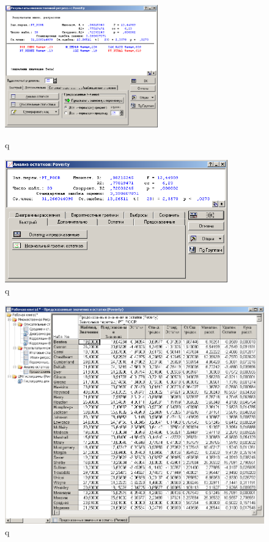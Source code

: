 \begin{figure}[!h]
  \centering
  \begin{minipage}{0.29\textwidth}
    \centering

    \includegraphics[height=5.3cm]
    {inc/example_23.PNG}

    \caption{q}
    \label{fig:example_23}
  \end{minipage}
  \begin{minipage}{0.69\textwidth}
    \centering

    \includegraphics[height=5.3cm]
    {inc/example_24.PNG}

    \caption{q}
    \label{fig:example_24}
  \end{minipage}
\end{figure}

\begin{figure}[!h]
  \centering

  \includegraphics[width=14cm]
  {inc/example_25.PNG}

  \caption{q}

  \label{fig:example_25}
\end{figure}

